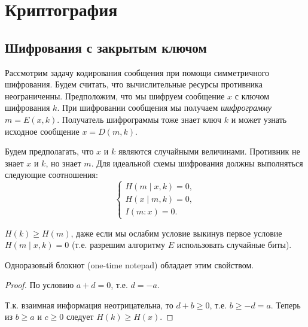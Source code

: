 \documentclass[12pt]{article}
\begin{document}
\section{Криптография}
\subsection{Шифрования с закрытым ключом}

Рассмотрим задачу кодирования сообщения при помощи симметричного шифрования.
Будем считать, что вычислительные ресурсы противника неограниченны. 
Предположим, что мы шифруем сообщение $x$ с ключом шифрования $k$. При
шифровании сообщения мы получаем \emph{шифрограмму} $m = E(x, k)$.
Получатель шифрограммы тоже знает ключ $k$ и может узнать исходное
сообщение $x= D(m,k).$

Будем предполагать, что $x$ и $k$ являются случайными 
величинами. Противник не знает $x$ и $k$, но знает $m$. Для идеальной
схемы шифрования должны выполняться следующие соотношения:
\[
\begin{cases}
    H(m\mid x,k) = 0,\\
    H(x\mid m,k) = 0,\\
    I(m : x) = 0.
\end{cases}
\]

\begin{theorem}[Шеннон]
    $H(k)\ge H(m)$, даже если мы ослабим условие выкинув первое условие
    $H(m\mid x,k) = 0$ (т.е. разрешим алгоритму $E$ использовать случайные
    биты).
\end{theorem}     
\begin{remark}
    Одноразовый блокнот (one-time notepad) обладает этим свойством.
\end{remark}
\begin{proof}
    По условию $a + d = 0$, т.е. $d = -a$. 

    \begin{center}
    \end{center}
    Т.к. взаимная информация неотрицательна, то $d + b\ge 0$, т.е. 
    $b \ge -d = a$. Теперь из $b \ge a$ и $c\ge 0$ следует $H(k)\ge H(x)$.                                  
\end{proof}
\end{document}
